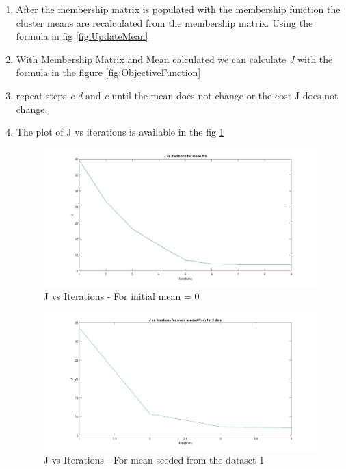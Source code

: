 \documentclass[10pt, letterpaper]{article}
\begin{document}
\begin{enumerate}
\begin{enumerate}
To calculate the distance between the sample and the mean 

To break ties in this step : If the sample is equidistant to two clusters 1 and 2, we label the sample under cluster 1.  and so on. So we choose sample to be in the first cluster among the group of clusters that are in a tie. So every sample will only be a part of one cluster.

\item After the membership matrix is populated with the membership function the cluster means are recalculated from the membership matrix. Using the formula in fig \ref{fig:UpdateMean}

\item With Membership Matrix and Mean calculated we can calculate {\sl J} with the formula in the figure \ref{fig:ObjectiveFunction}


\item repeat steps {\sl c} {\sl d} and {\sl e} until the mean does not change or the cost J does not change. 

\item The plot of J vs iterations is available in the fig \ref{fig:JvsI0}

 \begin{figure}[h!]
\centering
\includegraphics[scale=0.40]{JvsIterations_0mean}
\caption{J vs Iterations - For initial mean = 0 }
\label {fig:JvsI0}
\end{figure}

\begin{figure}[h!]
\centering
\includegraphics[scale=0.25]{JvsIterations_1mean}
\caption{J vs Iterations - For mean seeded from the dataset 1 }
\label {fig:JvsI1}
\end{figure}


\end{enumerate}
\end{enumerate}
\end{document}
